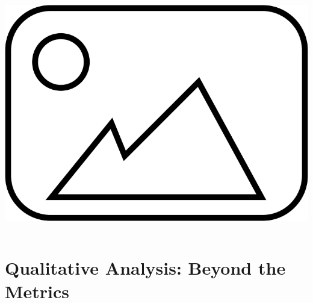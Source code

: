 \documentclass[aspectratio=169,10pt]{beamer}
\begin{document}
\begin{frame}
\begin{columns}[T]
\begin{column}{0.45\textwidth}
            \centering
            \includegraphics[width=\textwidth]{placeholder.png} %
            
        \end{column}
    \end{columns}
\end{frame}

\section{Qualitative Analysis: Beyond the Metrics}
\end{document}
